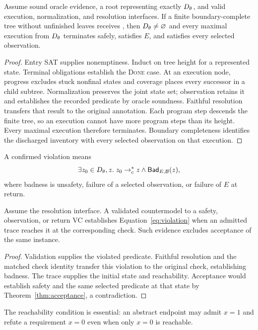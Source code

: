 \label{sec:verdicts}
\begin{theorem}
\label{thm:acceptance}
Assume sound oracle evidence, a root representing exactly $D_\theta$, and
valid execution, normalization, and resolution interfaces.
If a finite boundary-complete tree without unfinished leaves receives
\pass, then $D_\theta\ne\varnothing$ and every maximal execution from $D_\theta$
terminates safely, satisfies $E$, and satisfies every selected observation.
\end{theorem}
\begin{proof}
Entry SAT supplies nonemptiness. Induct on tree height for a represented
state. Terminal obligations establish the \textsc{Done} case.
At an execution node, progress excludes stuck nonfinal states and
coverage places every successor in a child subtree.
Normalization preserves the joint state set; observation retains it
and establishes the recorded predicate by oracle soundness. Faithful
resolution transfers that result to the original annotation.
Each program step descends the finite tree, so an execution cannot have
more program steps than its height. Every maximal execution therefore
terminates. Boundary completeness identifies the discharged inventory
with every selected observation on that execution.
\end{proof}

A confirmed violation means
\begin{equation}
\label{eq:violation}
 \exists z_0\in D_\theta,z.\;
 z_0\to_c^*z\land\mathsf{Bad}_{E,\mathcal B}(z),
\end{equation}
where badness is unsafety, failure of a selected observation, or failure
of $E$ at return.

\begin{proposition}
\label{prop:reachable-refutation}
Assume the resolution interface. A validated countermodel to a safety,
observation, or return VC establishes Equation~\eqref{eq:violation}
when an admitted trace reaches
it at the corresponding check. Such evidence excludes acceptance of
the same instance.
\end{proposition}
\begin{proof}
Validation supplies the violated predicate. Faithful resolution and
the matched check identity transfer this violation to the original check,
establishing badness. The trace supplies the initial state and
reachability. Acceptance would establish safety and the same selected
predicate at that state by Theorem~\ref{thm:acceptance}, a contradiction.
\end{proof}
The reachability condition is essential: an abstract endpoint may admit
$x=1$ and refute a requirement $x=0$ even when only $x=0$ is reachable.

